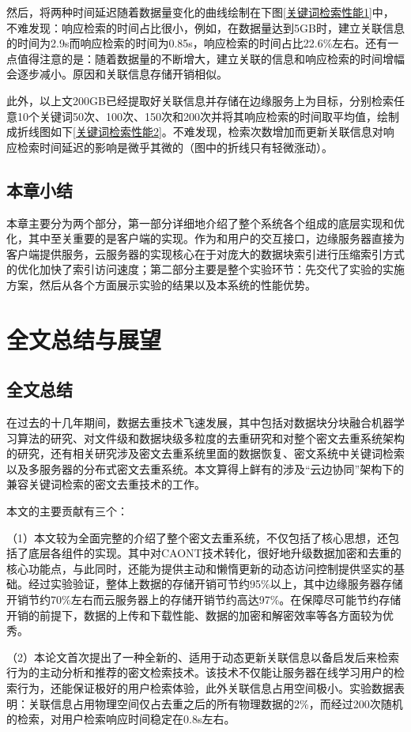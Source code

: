 \documentclass[promaster]{thesis-uestc}
\begin{document}
然后，将两种时间延迟随着数据量变化的曲线绘制在下图\ref{关键词检索性能1}中，不难发现：响应检索的时间占比很小，例如，在数据量达到5GB时，建立关联信息的时间为2.9s而响应检索的时间为0.85s，响应检索的时间占比22.6\%左右。还有一点值得注意的是：随着数据量的不断增大，建立关联的信息和响应检索的时间增幅会逐步减小。原因和关联信息存储开销相似。

此外，以上文200GB已经提取好关联信息并存储在边缘服务上为目标，分别检索任意10个关键词50次、100次、150次和200次并将其响应检索的时间取平均值，绘制成折线图如下\ref{关键词检索性能2}。不难发现，检索次数增加而更新关联信息对响应检索时间延迟的影响是微乎其微的（图中的折线只有轻微涨动）。


\section{本章小结}
本章主要分为两个部分，第一部分详细地介绍了整个系统各个组成的底层实现和优化，其中至关重要的是客户端的实现。作为和用户的交互接口，边缘服务器直接为客户端提供服务，云服务器的实现核心在于对庞大的数据块索引进行压缩索引方式的优化加快了索引访问速度；第二部分主要是整个实验环节：先交代了实验的实施方案，然后从各个方面展示实验的结果以及本系统的性能优势。

\chapter{全文总结与展望}\label{展望}
\section{全文总结}
在过去的十几年期间，数据去重技术飞速发展，其中包括对数据块分块融合机器学习算法的研究、对文件级和数据块级多粒度的去重研究和对整个密文去重系统架构的研究，还有相关研究涉及密文去重系统里面的数据恢复、密文系统中关键词检索以及多服务器的分布式密文去重系统。本文算得上鲜有的涉及“云边协同”架构下的兼容关键词检索的密文去重技术的工作。

本文的主要贡献有三个：

（1）本文较为全面完整的介绍了整个密文去重系统，不仅包括了核心思想，还包括了底层各组件的实现。其中对CAONT技术转化，很好地升级数据加密和去重的核心功能点，与此同时，还能为提供主动和懒惰更新的动态访问控制提供坚实的基础。经过实验验证，整体上数据的存储开销可节约95\%以上，其中边缘服务器存储开销节约70\%左右而云服务器上的存储开销节约高达97\%。在保障尽可能节约存储开销的前提下，数据的上传和下载性能、数据的加密和解密效率等各方面较为优秀。

（2）本论文首次提出了一种全新的、适用于动态更新关联信息以备启发后来检索行为的主动分析和推荐的密文检索技术。该技术不仅能让服务器在线学习用户的检索行为，还能保证极好的用户检索体验，此外关联信息占用空间极小。实验数据表明：关联信息占用物理空间仅占去重之后的所有物理数据的2\%，而经过200次随机的检索，对用户检索响应时间稳定在0.8s左右。
\end{document}
